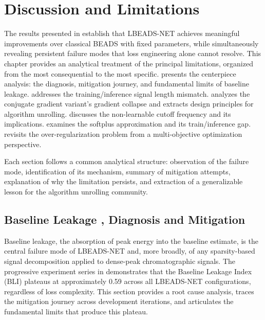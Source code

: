 \chapter{Discussion and Limitations}
\label{chap:discussion}

The results presented in  establish that LBEADS-NET achieves meaningful improvements over classical BEADS with fixed parameters, while simultaneously revealing persistent failure modes that loss engineering alone cannot resolve. This chapter provides an analytical treatment of the principal limitations, organized from the most consequential to the most specific.  presents the centerpiece analysis: the diagnosis, mitigation journey, and fundamental limits of baseline leakage.  addresses the training/inference signal length mismatch.  analyzes the conjugate gradient variant's gradient collapse and extracts design principles for algorithm unrolling.  discusses the non-learnable cutoff frequency and its implications.  examines the softplus approximation and its train/inference gap.  revisits the over-regularization problem from a multi-objective optimization perspective.

Each section follows a common analytical structure: observation of the failure mode, identification of its mechanism, summary of mitigation attempts, explanation of why the limitation persists, and extraction of a generalizable lesson for the algorithm unrolling community.


\section{Baseline Leakage ,  Diagnosis and Mitigation}
\label{sec:disc_leakage}

Baseline leakage, the absorption of peak energy into the baseline estimate, is the central failure mode of LBEADS-NET and, more broadly, of any sparsity-based signal decomposition applied to dense-peak chromatographic signals. The progressive experiment series in  demonstrates that the Baseline Leakage Index (BLI) plateaus at approximately 0.59 across all LBEADS-NET configurations, regardless of loss complexity. This section provides a root cause analysis, traces the mitigation journey across development iterations, and articulates the fundamental limits that produce this plateau.


